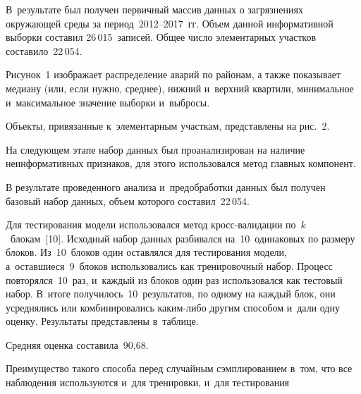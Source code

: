 \begin{multicols}{2}
  В~результате был получен первичный массив данных о загрязнениях 
окружающей среды за период~2012--2017~гг. Объем данной информативной 
выборки составил 26\,015~записей. Общее число элементарных участков 
составило~22\,054. 
  
  Рисунок~1 изображает распределение аварий по районам, а также показывает 
медиану (или, если нужно, среднее), нижний и~верхний квартили, минимальное и~максимальное значение выборки и~выбросы.


  Объекты, привязанные к~элементарным участкам, представлены на рис.~2. 
  

  
  На следующем этапе набор данных был проанализирован на наличие 
неинформативных признаков, для этого использовался метод главных 
компонент.
  
  В результате проведенного анализа и~предобработки данных был получен 
базовый набор данных, объем которого составил~22\,054.
  
  Для тестирования модели использовался метод кросс-ва\-ли\-да\-ции 
по~$k$~блокам~[10]. Исходный набор данных разбивался на~10~одинаковых 
по размеру блоков. Из~10~блоков один оставлялся для тестирования модели, 
а~оставшиеся~9~блоков использовались как тренировочный набор. Процесс 
повторялся~10~раз, и~каждый из блоков один раз использовался как тестовый 
набор. В~итоге получилось~10~результатов, по одному на каждый блок, они 
усреднялись или комбинировались ка\-ким-либо другим способом и~дали одну 
оценку. Результаты представлены в~таблице.
  
  
  
  Средняя оценка составила~90,68.
  
  Преимущество такого способа перед случайным сэмплированием в~том, что 
все наблюдения используются и~для тренировки, и~для тестирования\linebreak\vspace*{-12pt}
  

\end{multicols}
